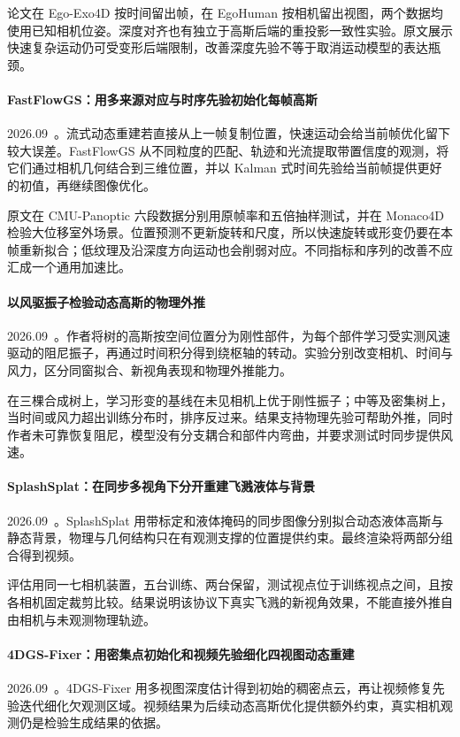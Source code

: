论文在 Ego-Exo4D 按时间留出帧，在 EgoHuman 按相机留出视图，两个数据均使用已知相机位姿。深度对齐也有独立于高斯后端的重投影一致性实验。原文展示快速复杂运动仍可受变形后端限制，改善深度先验不等于取消运动模型的表达瓶颈。

\paragraph{FastFlowGS：用多来源对应与时序先验初始化每帧高斯}
2026.09~\cite{2609_16310}。流式动态重建若直接从上一帧复制位置，快速运动会给当前帧优化留下较大误差。FastFlowGS 从不同粒度的匹配、轨迹和光流提取带置信度的观测，将它们通过相机几何结合到三维位置，并以 Kalman 式时间先验给当前帧提供更好的初值，再继续图像优化。

原文在 CMU-Panoptic 六段数据分别用原帧率和五倍抽样测试，并在 Monaco4D 检验大位移室外场景。位置预测不更新旋转和尺度，所以快速旋转或形变仍要在本帧重新拟合；低纹理及沿深度方向运动也会削弱对应。不同指标和序列的改善不应汇成一个通用加速比。

\paragraph{以风驱振子检验动态高斯的物理外推}
2026.09~\cite{2609_17810}。作者将树的高斯按空间位置分为刚性部件，为每个部件学习受实测风速驱动的阻尼振子，再通过时间积分得到绕枢轴的转动。实验分别改变相机、时间与风力，区分同窗拟合、新视角表现和物理外推能力。

在三棵合成树上，学习形变的基线在未见相机上优于刚性振子；中等及密集树上，当时间或风力超出训练分布时，排序反过来。结果支持物理先验可帮助外推，同时作者未可靠恢复阻尼，模型没有分支耦合和部件内弯曲，并要求测试时同步提供风速。

\paragraph{SplashSplat：在同步多视角下分开重建飞溅液体与背景}
2026.09~\cite{2609_20818}。SplashSplat 用带标定和液体掩码的同步图像分别拟合动态液体高斯与静态背景，物理与几何结构只在有观测支撑的位置提供约束。最终渲染将两部分组合得到视频。

评估用同一七相机装置，五台训练、两台保留，测试视点位于训练视点之间，且按各相机固定裁剪比较。结果说明该协议下真实飞溅的新视角效果，不能直接外推自由相机与未观测物理轨迹。

\paragraph{4DGS-Fixer：用密集点初始化和视频先验细化四视图动态重建}
2026.09~\cite{2609_21176}。4DGS-Fixer 用多视图深度估计得到初始的稠密点云，再让视频修复先验迭代细化欠观测区域。视频结果为后续动态高斯优化提供额外约束，真实相机观测仍是检验生成结果的依据。

